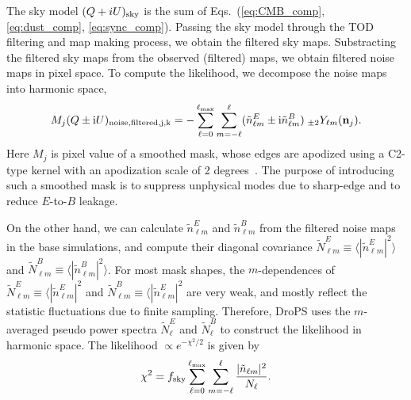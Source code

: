 \documentclass[12pt, a4paper]{ctexart} %
\begin{document}
The sky model $(Q+iU)_{\rm sky}$ is the sum of Eqs.~(\ref{eq:CMB_comp}, \ref{eq:dust_comp}, \ref{eq:sync_comp}). Passing the sky model through the TOD filtering and map making process, we obtain the filtered sky maps. Substracting the filtered sky maps from the observed (filtered) maps, we obtain filtered noise maps in pixel space. To compute the likelihood, we decompose the noise maps into harmonic space,
\begin{equation}
   M_j(Q\pm \mathrm{i}U)_{\rm noise, filtered, j, k} = -\sum_{\ell = 0}^{\ell_{\max}}\sum_{m=-\ell}^\ell (\tilde{n}_{\ell m}^E\pm \mathrm{i} \tilde{n}_{\ell m}^B)\;_{\pm 2}Y_{\ell m}(\mathbf{n}_j).
\end{equation}
Here $M_j$ is pixel value of a smoothed mask, whose edges are apodized using a C2-type kernel  with an apodization scale of 2 degrees~\cite{Grain09}.  The purpose of introducing such a smoothed mask is to suppress unphysical modes due to sharp-edge and to reduce $E$-to-$B$ leakage.

On the other hand, we can calculate $\tilde{n}_{\ell m}^E$ and $\tilde{n}_{\ell m}^B$ from the filtered noise maps in the base simulations, and compute their diagonal covariance $\tilde{N}^E_{\ell m} \equiv \langle |\tilde{n}_{\ell m}^E|^2\rangle $ and $\tilde{N}^B_{\ell m} \equiv \langle |\tilde{n}_{\ell m}^B|^2\rangle $. For most mask shapes, the $m$-dependences of $\tilde{N}^E_{\ell m} \equiv \langle |\tilde{n}_{\ell m}^E|^2$ and $\tilde{N}^B_{\ell m} \equiv \langle |\tilde{n}_{\ell m}^E|^2$ are very weak, and mostly reflect the statistic fluctuations due to finite sampling. Therefore, DroPS uses the $m$-averaged pseudo power spectra $\tilde{N}_\ell^E$ and $\tilde{N}_\ell^B$ to construct the likelihood in harmonic space. The likelihood $\propto e^{-\chi^2/2}$ is given by
\begin{equation}
  \chi^2 = f_{\rm sky}\sum_{\ell = 0}^{\ell_{\max}} \sum_{m=-\ell}^\ell \frac{|\tilde{n}_{\ell m}|^2}{N_{\ell}}.
\end{equation}





 
\end{document}
